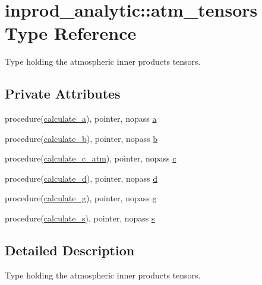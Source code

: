 \hypertarget{structinprod__analytic_1_1atm__tensors}{}\section{inprod\+\_\+analytic\+:\+:atm\+\_\+tensors Type Reference}
\label{structinprod__analytic_1_1atm__tensors}


Type holding the atmospheric inner products tensors.  


\subsection*{Private Attributes}
\begin{DoxyCompactItemize}
\item 
procedure(\hyperlink{namespaceinprod__analytic_afc3e503e1fd9774693f02e0fe87ec63a}{calculate\+\_\+a}), pointer, nopass \hyperlink{structinprod__analytic_1_1atm__tensors_abb8c2b843f31f85eadf4c183b9bbfc35}{a}
\item 
procedure(\hyperlink{namespaceinprod__analytic_a63625452db6424cf46aa93bb9ce3e2f2}{calculate\+\_\+b}), pointer, nopass \hyperlink{structinprod__analytic_1_1atm__tensors_a427a3462d211c39009bb85e0cfe4a59b}{b}
\item 
procedure(\hyperlink{namespaceinprod__analytic_aa242adb49ed57168cfd281c90ddd6490}{calculate\+\_\+c\+\_\+atm}), pointer, nopass \hyperlink{structinprod__analytic_1_1atm__tensors_a1fcb71de592cf7d87e8c7e13e445832c}{c}
\item 
procedure(\hyperlink{namespaceinprod__analytic_a519a70cc6ad55be09a56df9753e43e61}{calculate\+\_\+d}), pointer, nopass \hyperlink{structinprod__analytic_1_1atm__tensors_a0641c2984e3cf9eff629771519162b05}{d}
\item 
procedure(\hyperlink{namespaceinprod__analytic_afa66e718a91ec595e483cb20befce6a6}{calculate\+\_\+g}), pointer, nopass \hyperlink{structinprod__analytic_1_1atm__tensors_a4543ab64bfdcdb2aac1f2d9b1af2ee36}{g}
\item 
procedure(\hyperlink{namespaceinprod__analytic_a5cdb72e3766b95108cef81b2cff503f9}{calculate\+\_\+s}), pointer, nopass \hyperlink{structinprod__analytic_1_1atm__tensors_a27edca850b0482aea4aac985ec64124d}{s}
\end{DoxyCompactItemize}


\subsection{Detailed Description}
Type holding the atmospheric inner products tensors. 

